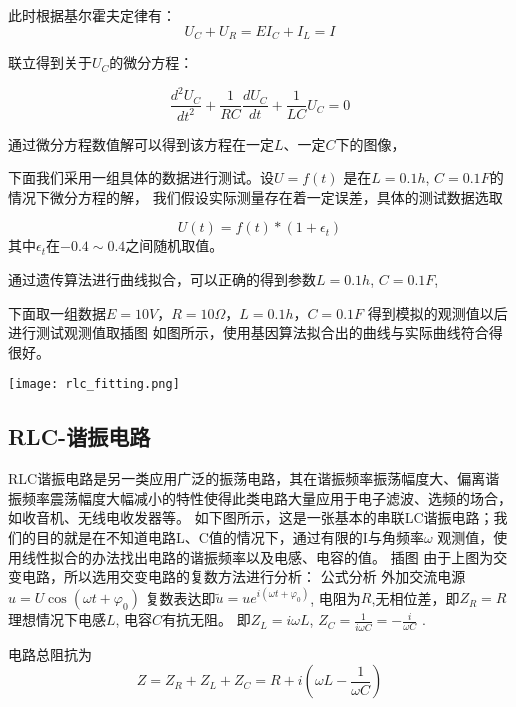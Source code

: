 \documentclass[a4paper]{article}
\begin{document}
此时根据基尔霍夫定律有：
\begin{equation}
U_C+U_R=E
I_C+I_L=I
\end{equation}

联立得到关于$U_C$的微分方程：

\begin{equation}
\frac{d^{2}U_C}{dt^{2}}+\frac{1}{RC}\frac{dU_C}{dt}+\frac{1}{LC}U_C=0
\end{equation}

通过微分方程数值解可以得到该方程在一定$L$、一定$C$下的图像，

下面我们采用一组具体的数据进行测试。设$U = f(t)$ 是在$L=0.1h$, $C = 0.1F$的情况下微分方程的解，
我们假设实际测量存在着一定误差，具体的测试数据选取

\begin{equation}
	U(t) = f(t) * (1 + \epsilon_t)
\end{equation}
其中$\epsilon_t$在$-0.4 \sim 0.4$之间随机取值。

通过遗传算法进行曲线拟合，可以正确的得到参数$L = 0.1h$, $C = 0.1F$, 


下面取一组数据$E=10V$，$R=10\Omega$，$L=0.1h$，$C=0.1F$
得到模拟的观测值以后进行测试观测值取插图
如图所示，使用基因算法拟合出的曲线与实际曲线符合得很好。

\begin{center}
\texttt{[image: rlc\_fitting.png]}
\end{center}

\subsection{RLC-谐振电路}

RLC谐振电路是另一类应用广泛的振荡电路，其在谐振频率振荡幅度大、偏离谐振频率震荡幅度大幅减小的特性使得此类电路大量应用于电子滤波、选频的场合，如收音机、无线电收发器等。
如下图所示，这是一张基本的串联LC谐振电路；我们的目的就是在不知道电路L、C值的情况下，通过有限的I与角频率$\omega$ 观测值，使用线性拟合的办法找出电路的谐振频率以及电感、电容的值。
插图
由于上图为交变电路，所以选用交变电路的复数方法进行分析：
公式分析
外加交流电源$u = U\cos(\omega t + \varphi_0)$ 复数表达即$\tilde{u} = u e^{i(\omega t + \varphi_0)}$,
电阻为$R$,无相位差，即$Z_R = R$
理想情况下电感$L$, 电容$C$有抗无阻。
即$Z_L = i\omega L$, $Z_C  = \frac{1}{i\omega C} = - \frac{i}{\omega C}$ .

电路总阻抗为
\begin{equation}
	Z = Z_R + Z_L + Z_C = R + i(\omega L - \frac{1}{\omega C})
\end{equation}
\end{document}
